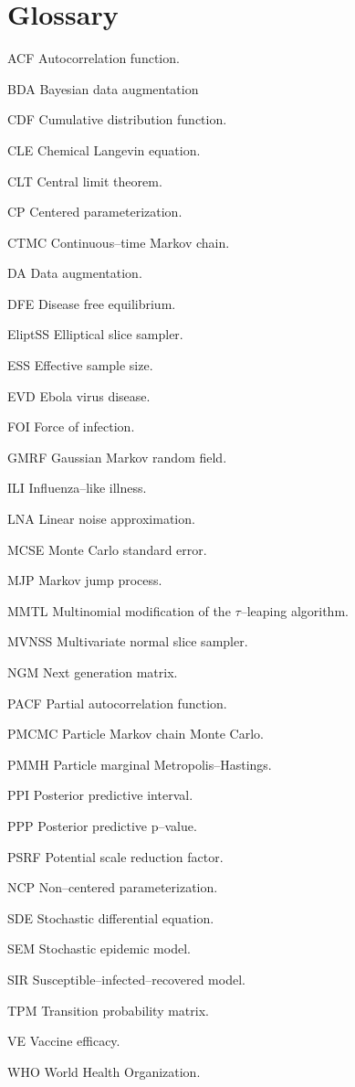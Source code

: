 \chapter*{Glossary}      %
\thispagestyle{plain}
%
\begin{glossary}
\item[ACF] Autocorrelation function.
\item[BDA] Bayesian data augmentation
\item[CDF] Cumulative distribution function.
\item[CLE] Chemical Langevin equation.
\item[CLT] Central limit theorem.
\item[CP] Centered parameterization.
\item[CTMC] Continuous--time Markov chain.
\item[DA] Data augmentation.
\item[DFE] Disease free equilibrium.
\item[EliptSS] Elliptical slice sampler.
\item[ESS] Effective sample size.
\item[EVD] Ebola virus disease.
\item[FOI] Force of infection.
\item[GMRF] Gaussian Markov random field.
\item[ILI] Influenza--like illness.
\item[LNA] Linear noise approximation.
\item[MCSE] Monte Carlo standard error.
\item[MJP] Markov jump process.
\item[MMTL] Multinomial modification of the $ \tau $--leaping algorithm.
\item[MVNSS] Multivariate normal slice sampler.
\item[NGM] Next generation matrix.
\item[PACF] Partial autocorrelation function.
\item[PMCMC] Particle Markov chain Monte Carlo.
\item[PMMH] Particle marginal Metropolis--Hastings.
\item[PPI] Posterior predictive interval.
\item[PPP] Posterior predictive p--value.
\item[PSRF] Potential scale reduction factor.
\item[NCP] Non--centered parameterization.
\item[SDE] Stochastic differential equation.
\item[SEM] Stochastic epidemic model.
\item[SIR] Susceptible--infected--recovered model.
\item[TPM] Transition probability matrix.
\item[VE] Vaccine efficacy.
\item[WHO] World Health Organization.
\end{glossary}
 

